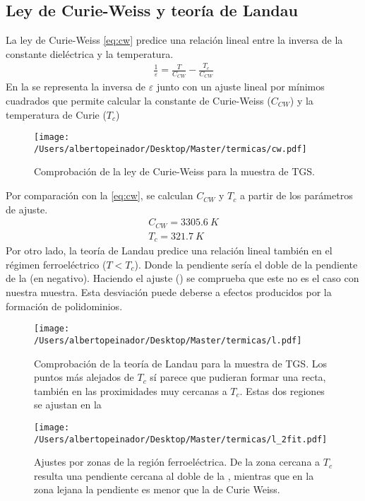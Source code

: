 \documentclass[a4paper, 12pt, spanish]{article}
\begin{document}
\begin{multicols}{2}
\subsection*{Ley de Curie-Weiss y teoría de Landau}
La ley de Curie-Weiss \cref{eq:cw} predice una relación lineal entre la inversa de la constante dieléctrica y la temperatura.
\begin{eqnarray}
    \frac{1}{\varepsilon} = \frac{T}{C_{CW}}-\frac{T_c}{C_{CW}}\label{eq:cw}
\end{eqnarray}
En la  se representa la inversa de $\varepsilon$ junto con un ajuste lineal por mínimos cuadrados que permite calcular la constante de Curie-Weiss ($C_{CW}$) y la temperatura de Curie ($T_c$)
\begin{figure}[H]
    \centering
    \texttt{[image: /Users/albertopeinador/Desktop/Master/termicas/cw.pdf]}
    \caption{Comprobación de la ley de Curie-Weiss para la muestra de TGS.}\label{fig:cw}
\end{figure}

Por comparación con la \cref{eq:cw}, se calculan $C_{CW}$ y $T_c$ a partir de los parámetros de ajuste.\begin{eqnarray}
    C_{CW} = 3305.6\ K\\
    T_c = 321.7\ K
\end{eqnarray}
Por otro lado, la teoría de Landau predice una relación lineal también en el régimen ferroeléctrico ($T<T_c$). Donde la pendiente sería el doble de la pendiente de la  (en negativo). Haciendo el ajuste () se comprueba que este no es el caso con nuestra muestra. Esta desviación puede deberse a efectos producidos por la formación de polidominios.
\begin{figure}[H]
    \centering
    \texttt{[image: /Users/albertopeinador/Desktop/Master/termicas/l.pdf]}
    \caption{Comprobación de la teoría de Landau para la muestra de TGS. Los puntos más alejados de $T_c$ sí parece que pudieran formar una recta, también en las proximidades muy cercanas a $T_c$. Estas dos regiones se ajustan en la }\label{fig:l}
\end{figure}
\begin{figure}[H]
    \centering
    \texttt{[image: /Users/albertopeinador/Desktop/Master/termicas/l\_2fit.pdf]}
    \caption{Ajustes por zonas de la región ferroeléctrica. De la zona cercana a $T_c$ resulta una pendiente cercana al doble de la , mientras que en la zona lejana la pendiente es menor que la de Curie Weiss.}\label{fig:l_2}
\end{figure}


\end{multicols}
\end{document}
